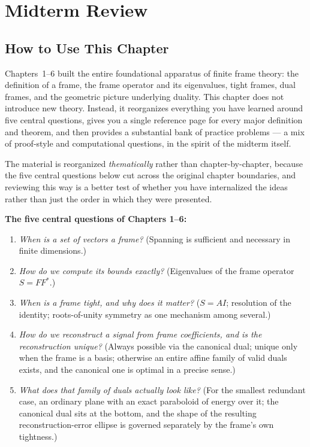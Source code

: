 \chapter{Midterm Review}
\label{ch:review}
\section{How to Use This Chapter}
\label{sec:ch7-overview}

Chapters~1--6 built the entire foundational apparatus of finite frame
theory: the definition of a frame, the frame operator and its
eigenvalues, tight frames, dual frames, and the geometric picture
underlying duality. This chapter does not introduce new theory.
Instead, it reorganizes everything you have learned around five central
questions, gives you a single reference page for every major definition
and theorem, and then provides a substantial bank of practice problems
--- a mix of proof-style and computational questions, in the spirit of
the midterm itself.

The material is reorganized \emph{thematically} rather than
chapter-by-chapter, because the five central questions below cut across
the original chapter boundaries, and reviewing this way is a better test
of whether you have internalized the ideas rather than just the order in
which they were presented.

\begin{keyidea}
\textbf{The five central questions of Chapters 1--6:}
\begin{enumerate}[label=(\arabic*)]
  \item \emph{When is a set of vectors a frame?} (Spanning is
        sufficient and necessary in finite dimensions.)
  \item \emph{How do we compute its bounds exactly?} (Eigenvalues of
        the frame operator $S=FF^*$.)
  \item \emph{When is a frame tight, and why does it matter?}
        ($S=AI$; resolution of the identity; roots-of-unity symmetry as
        one mechanism among several.)
  \item \emph{How do we reconstruct a signal from frame coefficients,
        and is the reconstruction unique?} (Always possible via the
        canonical dual; unique only when the frame is a basis;
        otherwise an entire affine family of valid duals exists, and the
        canonical one is optimal in a precise sense.)
  \item \emph{What does that family of duals actually look like?}
        (For the smallest redundant case, an ordinary plane with an
        exact paraboloid of energy over it; the canonical dual sits at
        the bottom, and the shape of the resulting reconstruction-error
        ellipse is governed separately by the frame's own tightness.)
\end{enumerate}
\end{keyidea}

